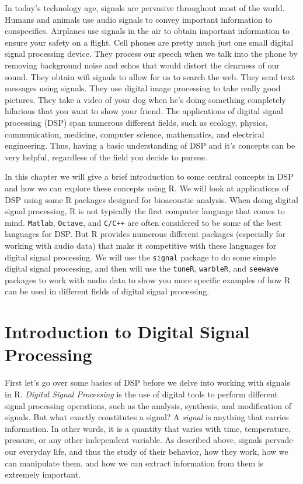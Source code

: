 \documentclass[
]{krantz}
\begin{document}
In today's technology age, signals are pervasive throughout most of the world. Humans and animals use audio signals to convey important information to conspecifics. Airplanes use signals in the air to obtain important information to ensure your safety on a flight. Cell phones are pretty much just one small digital signal processing device. They process our speech when we talk into the phone by removing background noise and echos that would distort the clearness of our sound. They obtain wifi signals to allow for us to search the web. They send text messages using signals. They use digital image processing to take really good pictures. They take a video of your dog when he's doing something completely hilarious that you want to show your friend. The applications of digital signal processing (DSP) span numerous different fields, such as ecology, physics, communication, medicine, computer science, mathematics, and electrical engineering. Thus, having a basic understanding of DSP and it's concepts can be very helpful, regardless of the field you decide to pursue.

In this chapter we will give a brief introduction to some central concepts in DSP and how we can explore these concepts using R. We will look at applications of DSP using some R packages designed for bioacoustic analysis. When doing digital signal processing, R is not typically the first computer language that comes to mind. \texttt{Matlab}, \texttt{Octave}, and \texttt{C/C++} are often considered to be some of the best languages for DSP. But R provides numerous different packages (especially for working with audio data) that make it competitive with these languages for digital signal processing. We will use the \texttt{signal} package to do some simple digital signal processing, and then will use the \texttt{tuneR}, \texttt{warbleR}, and \texttt{seewave} packages to work with audio data to show you more specific examples of how R can be used in different fields of digital signal processing.

\hypertarget{introduction-to-digital-signal-processing}{%
\section{Introduction to Digital Signal Processing}\label{introduction-to-digital-signal-processing}}

First let's go over some basics of DSP before we delve into working with signals in R. \emph{Digital Signal Processing} is the use of digital tools to perform different signal processing operations, such as the analysis, synthesis, and modification of signals. But what exactly constitutes a signal? A \emph{signal} is anything that carries information. In other words, it is a quantity that varies with time, temperature, pressure, or any other independent variable. As described above, signals pervade our everyday life, and thus the study of their behavior, how they work, how we can manipulate them, and how we can extract information from them is extremely important.
\end{document}
